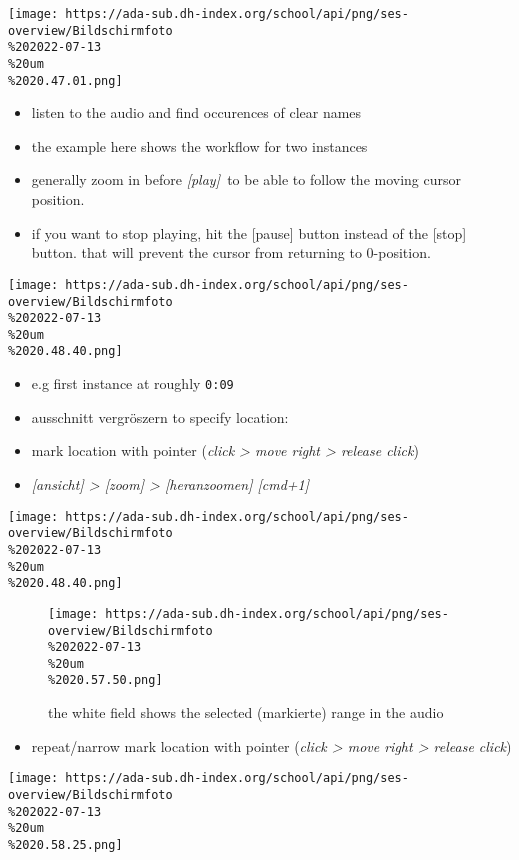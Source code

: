 \documentclass[
  12pt,
]{article}
\providecommand{\tightlist}{%
  \setlength{\itemsep}{0pt}\setlength{\parskip}{0pt}}
\begin{document}
\texttt{[image: https://ada-sub.dh-index.org/school/api/png/ses-overview/Bildschirmfoto\\\%202022-07-13\\\%20um\\\%2020.47.01.png]}

\begin{itemize}
\tightlist
\item
  listen to the audio and find occurences of clear names
\item
  the example here shows the workflow for two instances
\item
  generally zoom in before \emph{{[}play{]}~}to be able to follow the
  moving cursor position.
\item
  if you want to stop playing, hit the {[}pause{]} button instead of the
  {[}stop{]} button. that will prevent the cursor from returning to
  0-position.
\end{itemize}

\texttt{[image: https://ada-sub.dh-index.org/school/api/png/ses-overview/Bildschirmfoto\\\%202022-07-13\\\%20um\\\%2020.48.40.png]}

\begin{itemize}
\tightlist
\item
  e.g first instance at roughly \texttt{0:09}
\item
  ausschnitt vergröszern to specify location:
\item
  mark location with pointer (\emph{click \textgreater{} move right
  \textgreater{} release click})
\item
  \emph{{[}ansicht{]} \textgreater{} {[}zoom{]} \textgreater{}
  {[}heranzoomen{]} {[}cmd+1{]}}
\end{itemize}

\texttt{[image: https://ada-sub.dh-index.org/school/api/png/ses-overview/Bildschirmfoto\\\%202022-07-13\\\%20um\\\%2020.48.40.png]}

\begin{figure}
\centering
\texttt{[image: https://ada-sub.dh-index.org/school/api/png/ses-overview/Bildschirmfoto\\\%202022-07-13\\\%20um\\\%2020.57.50.png]}
\caption{the white field shows the selected (markierte) range in the
audio}
\end{figure}

\begin{itemize}
\tightlist
\item
  repeat/narrow mark location with pointer (\emph{click \textgreater{}
  move right \textgreater{} release click})
\end{itemize}

\texttt{[image: https://ada-sub.dh-index.org/school/api/png/ses-overview/Bildschirmfoto\\\%202022-07-13\\\%20um\\\%2020.58.25.png]}
\end{document}
